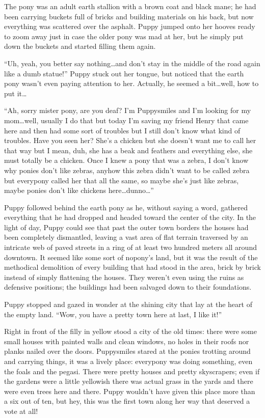 The pony was an adult earth stallion with a brown coat and black mane; he had been carrying buckets full of bricks and building materials on his back, but now everything was scattered over the asphalt. Puppy jumped onto her hooves ready to zoom away just in case the older pony was mad at her, but he simply put down the buckets and started filling them again.

``Uh, yeah, you better say nothing\dots and don't stay in the middle of the road again like a dumb statue!'' Puppy stuck out her tongue, but noticed that the earth pony wasn't even paying attention to her. Actually, he seemed a bit\dots well, how to put it\dots

``Ah, sorry mister pony, are you deaf? I'm Puppysmiles and I'm looking for my mom\dots well, usually I do that but today I'm saving my friend Henry that came here and then had some sort of troubles but I still don't know what kind of troubles. Have you seen her? She's a chicken but she doesn't want me to call her that way but I mean, duh, she has a beak and feathers and everything else, she must totally be a chicken. Once I knew a pony that was a zebra, I don't know why ponies don't like zebras, anyhow this zebra didn't want to be called zebra but everypony called her that all the same, so maybe she's just like zebras, maybe ponies don't like chickens here\dots dunno\dots''

Puppy followed behind the earth pony as he, without saying a word, gathered everything that he had dropped and headed toward the center of the city. In the light of day, Puppy could see that past the outer town borders the houses had been completely dismantled, leaving a vast area of flat terrain traversed by an intricate web of paved streets in a ring of at least two hundred meters all around downtown. It seemed like some sort of nopony's land, but it was the result of the methodical demolition of every building that had stood in the area, brick by brick instead of simply flattening the houses. They weren't even using the ruins as defensive positions; the buildings had been salvaged down to their foundations.

Puppy stopped and gazed in wonder at the shining city that lay at the heart of the empty land. ``Wow, you have a pretty town here at last, I like it!''

Right in front of the filly in yellow stood a city of the old times: there were some small houses with painted walls and clean windows, no holes in their roofs nor planks nailed over the doors. Puppysmiles stared at the ponies trotting around and carrying things, it was a lively place: everypony was doing something, even the foals and the pegasi. There were pretty houses and pretty skyscrapers; even if the gardens were a little yellowish there was actual grass in the yards and there were even trees here and there. Puppy wouldn't have given this place more than a six out of ten, but hey, this was the first town along her way that deserved a vote at all!

